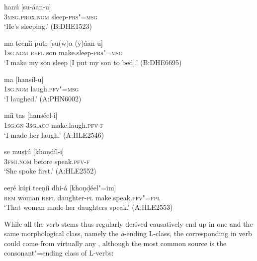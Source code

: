 \begin{exe}
\ex
\label{ex:8-7}
\gll hanú [su-áan-u] \\
\textsc{3msg.prox.nom} sleep-\textsc{prs"=msg} \\
\glt `He's sleeping.' (B:DHE1523)
\end{exe}
\begin{exe}
\ex
\label{ex:8-8}
\gll ma teeṇíi putr [su(w)a-(y)áan-u]  \\
\textsc{1sg.nom} \textsc{refl} son make.sleep-\textsc{prs"=msg} \\
\glt `I make my son sleep [I put my son to bed].' (B:DHE6695)
\end{exe}
\begin{exe}
\ex
\label{ex:8-9}
\gll ma [hansíl-u] \\
\textsc{1sg.nom} laugh.\textsc{pfv"=msg} \\
\glt `I laughed.' (A:PHN6002)
\end{exe}
\begin{exe}
\ex
\label{ex:8-10}
\gll míi tas [hanséel-i] \\
\textsc{1sg.gn} \textsc{3sg.acc} make.laugh.\textsc{pfv-f} \\
\glt `I made her laugh.' (A:HLE2546)
\end{exe}
\begin{exe}
\ex
\label{ex:8-11}
\gll se muṣṭú [khoṇḍíl-i] \\
\textsc{3fsg.nom} before speak.\textsc{pfv-f} \\
\glt `She spoke first.' (A:HLE2552)
\end{exe}
\begin{exe}
\ex
\label{ex:8-12}
\gll eeṛé kúṛi teeṇíi dhi-á [khoṇḍéel"=im] \\
\textsc{rem} woman \textsc{refl} daughter-\textsc{pl} make.speak.\textsc{pfv"=fpl} \\
\glt `That woman made her daughters speak.' (A:HLE2553)
\end{exe}

While all the verb stems thus regularly derived causatively end up in one and the same morphological class, namely the \textit{a}-ending L-class, the corresponding in verb could come from virtually any , although the most common source is the consonant"=ending class of L-verbs:


